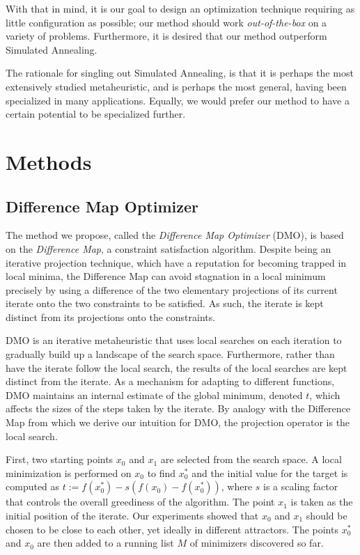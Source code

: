 \documentclass[12pt]{article}
\begin{document}
With that in mind, it is our goal to design an optimization technique
requiring as little configuration as possible; our method should work
\emph{out-of-the-box} on a variety of problems. Furthermore, it is desired
that our method outperform Simulated Annealing.

The rationale for singling out Simulated Annealing, is that it is perhaps
the most extensively studied metaheuristic, and is perhaps the most
general, having been specialized in many applications. Equally, we would
prefer our method to have a certain potential to be specialized further.


\section{Methods}

\subsection{Difference Map Optimizer}
The method we propose, called the \emph{Difference Map Optimizer} (DMO), is
based on the \emph{Difference Map}\cite{elser2007}, a constraint
satisfaction algorithm.
Despite being an iterative projection technique, which have a reputation
for becoming trapped in local minima, the Difference Map can avoid
stagnation in a local minimum precisely by using a difference of the two
elementary projections of its current iterate onto the two constraints to
be satisfied. As such, the iterate is kept distinct from its projections
onto the constraints.

DMO is an iterative metaheuristic that uses local searches on each
iteration to gradually build up a landscape of the search space.
Furthermore, rather than have the iterate follow the local search, the
results of the local searches are kept distinct from the iterate.
As a mechanism for adapting to different functions, DMO maintains an
internal estimate of the global minimum, denoted $t$, which affects the
sizes of the steps taken by the iterate. By analogy with the Difference Map
from which we derive our intuition for DMO, the projection operator is the
local search.

First, two starting points $x_0$ and $x_1$ are selected from the search
space.
A local minimization is performed on $x_0$ to find $x_0^*$ and the
initial value for the target is computed as
$t := f(x_0^*) - s (f(x_0) - f(x_0^*))$,
where $s$ is a scaling factor that controls the overall greediness of the
algorithm.
The point $x_1$ is taken as the initial position of the iterate. Our
experiments showed that $x_0$ and $x_1$ should be chosen to be close to
each other, yet ideally in different attractors.
The points $x_0^*$ and $x_0$ are then added to a running list $M$ of
minimizers discovered so far.
\end{document}
